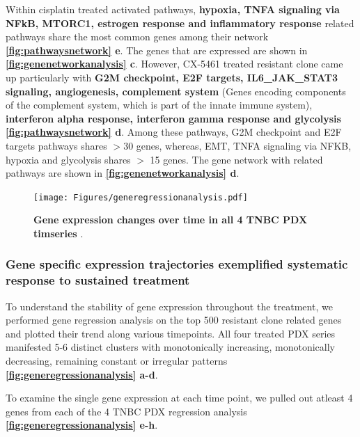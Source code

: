 Within cisplatin treated activated pathways, \textbf{hypoxia, TNFA signaling via NFkB, MTORC1, estrogen response and inflammatory response} related pathways share the most common genes among their network \textbf{\autoref{fig:pathwaysnetwork} e}. The genes that are expressed are shown in  \textbf{\autoref{fig:genenetworkanalysis} c}. However, CX-5461 treated resistant clone came up particularly with \textbf{G2M checkpoint, E2F targets, IL6\_JAK\_STAT3 signaling, angiogenesis, complement system} (Genes encoding components of the complement system, which is part of the innate immune system), \textbf{ interferon alpha response, interferon gamma response and glycolysis} \textbf{\autoref{fig:pathwaysnetwork} d}. Among these pathways, G2M checkpoint and E2F targets pathways shares $>$30 genes, whereas, \ac{EMT}, TNFA signaling via NFKB, hypoxia and glycolysis shares $>$ 15 genes. The gene network with related pathways are shown in  \textbf{\autoref{fig:genenetworkanalysis} d}. 

\begin{figure}
\centering
 \texttt{[image: Figures/generegressionanalysis.pdf]}
	
\caption[Gene expression changes over time]
	{\small
	 \textbf{Gene expression changes over time in all 4 TNBC PDX timseries} .
	}
	\label{fig:generegressionanalysis}
\end{figure}


\subsubsection{Gene specific expression trajectories exemplified systematic response to sustained treatment}
To understand the stability of gene expression throughout the treatment, we performed gene regression analysis on the top 500 resistant clone related genes and plotted their trend along various timepoints. All four treated PDX series manifested 5-6 distinct clusters with monotonically increasing, monotonically decreasing, remaining constant or irregular patterns \textbf{\autoref{fig:generegressionanalysis} a-d}.

To examine the single gene expression at each time point, we pulled out atleast 4 genes from each of the 4 TNBC PDX regression analysis \textbf{\autoref{fig:generegressionanalysis} e-h}. 

